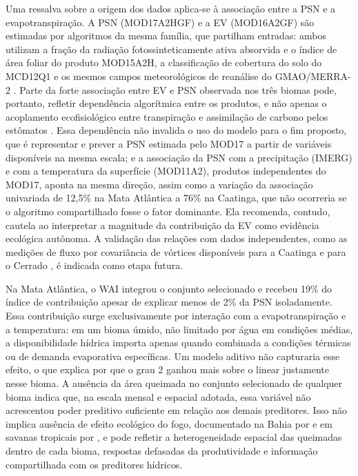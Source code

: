 \documentclass[a4paper,fleqn]{cas-sc}
\begin{document}
Uma ressalva sobre a origem dos dados aplica-se à associação entre a PSN e a evapotranspiração. A PSN (MOD17A2HGF) e a EV (MOD16A2GF) são estimadas por algoritmos da mesma família, que partilham entradas: ambos utilizam a fração da radiação fotossinteticamente ativa absorvida e o índice de área foliar do produto MOD15A2H, a classificação de cobertura do solo do MCD12Q1 e os mesmos campos meteorológicos de reanálise do GMAO/MERRA-2 \citep{running2004,running2021gpp,running2021et}. Parte da forte associação entre EV e PSN observada nos três biomas pode, portanto, refletir dependência algorítmica entre os produtos, e não apenas o acoplamento ecofisiológico entre transpiração e assimilação de carbono pelos estômatos \citep{lawson2019}. Essa dependência não invalida o uso do modelo para o fim proposto, que é representar e prever a PSN estimada pelo MOD17 a partir de variáveis disponíveis na mesma escala; e a associação da PSN com a precipitação (IMERG) e com a temperatura da superfície (MOD11A2), produtos independentes do MOD17, aponta na mesma direção, assim como a variação da associação univariada de 12,5\% na Mata Atlântica a 76\% na Caatinga, que não ocorreria se o algoritmo compartilhado fosse o fator dominante. Ela recomenda, contudo, cautela ao interpretar a magnitude da contribuição da EV como evidência ecológica autônoma. A validação das relações com dados independentes, como as medições de fluxo por covariância de vórtices disponíveis para a Caatinga \citep{mendes2020,mendes2025} e para o Cerrado \citep{vourlitis2022}, é indicada como etapa futura.

Na Mata Atlântica, o WAI integrou o conjunto selecionado e recebeu 19\% do índice de contribuição apesar de explicar menos de 2\% da PSN isoladamente. Essa contribuição surge exclusivamente por interação com a evapotranspiração e a temperatura: em um bioma úmido, não limitado por água em condições médias, a disponibilidade hídrica importa apenas quando combinada a condições térmicas ou de demanda evaporativa específicas. Um modelo aditivo não capturaria esse efeito, o que explica por que o grau 2 ganhou mais sobre o linear justamente nesse bioma. A ausência da área queimada no conjunto selecionado de qualquer bioma indica que, na escala mensal e espacial adotada, essa variável não acrescentou poder preditivo suficiente em relação aos demais preditores. Isso não implica ausência de efeito ecológico do fogo, documentado na Bahia por \citet{benfica2022,benfica2023} e em savanas tropicais por \citet{navarro2025}, e pode refletir a heterogeneidade espacial das queimadas dentro de cada bioma, respostas defasadas da produtividade e informação compartilhada com os preditores hídricos.
\end{document}
